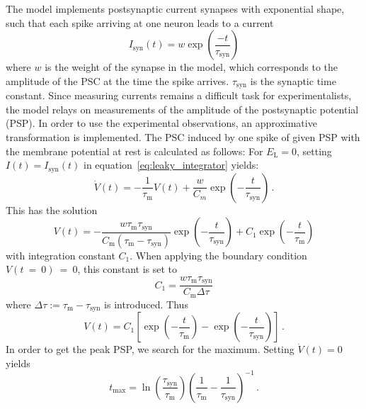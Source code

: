 The model implements  
postsynaptic current synapses with exponential shape, such that each 
spike arriving at one neuron leads to a current 
\begin{equation}
I_{\text{syn}}(t) = w \exp{\left(\frac{-t}{\tau_\text{syn}}\right)}	
    \label{eq:synaptic_current}
\end{equation}
where $w$ is the weight of the synapse in the model,
which corresponds to the amplitude of the PSC
at the time the spike arrives. 
$\tau_\text{syn}$ is the synaptic time constant.
Since measuring currents remains a difficult task for experimentalists, 
the model relays on measurements of the amplitude of the postsynaptic 
potential (PSP). In order to use the experimental observations,
an approximative transformation is implemented.
The PSC induced by one spike of given PSP with the membrane potential
at rest is calculated as follows:
For $E_\text{L} = 0$, setting $I(t) = I_\text{syn}(t)$ in equation~\eqref{eq:leaky_integrator}
yields:
\begin{equation}
    \dot{V}(t)
    = - \frac{1}{\tau_\text{m}} V(t) + \frac{w}{C_m} \exp{\left(-\frac{t}{\tau_\text{syn}}\right)} \,.
    \label{eq:psc_ode}
\end{equation}
This has the solution 
\begin{equation}
    V(t) =   
        - \frac{w \tau_\text{m} \tau_\text{syn}} {C_\text{m} \left(\tau_\text{m} - \tau_\text{syn}\right)}	
        \exp{\left( -\frac{t}{\tau_\text{syn}} \right)} 
        + C_1 \exp{\left(-\frac{t}{\tau_\text{m}} \right)}
    \label{eq:psc_ode_sol}
\end{equation}
with integration constant $C_1$.
When applying the boundary condition $V(t~=~0)~=~0$, this constant is set to
\begin{equation}
    C_1 = \frac{w \tau_\text{m} \tau_\text{syn}}{C_\text{m} \Delta\tau}	
    \label{eq:C_1}
\end{equation}
where $\Delta\tau := \tau_\text{m} - \tau_\text{syn}$ is introduced.
Thus
\begin{equation}
    V(t) = C_1 \left[\exp\left(-\frac{t}{\tau_\text{m}}\right) - \exp\left(-\frac{t}{\tau_\text{syn}}\right)\right]	\,.  
    \label{eq:V(t)}
\end{equation}
In order to get the peak PSP, we search for the maximum. Setting $\dot{V}(t) = 0$ 
yields
\begin{equation}
    t_\text{max} 
        = \ln{\!\left(\frac{\tau_\text{syn}}{\tau_\text{m}}\right)} 
            \left(\frac{1}{\tau_\text{m}} - \frac{1}{\tau_\text{syn}}\right)^{-1} \,.
    \label{eq:t_max}
\end{equation}

